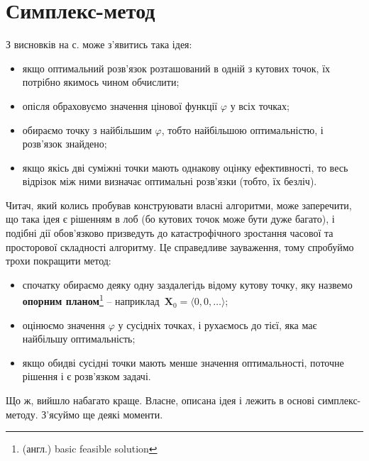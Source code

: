 \documentclass[\main/book.tex]{subfiles}
\begin{document}
\section{Симплекс-метод}
\label{section:linear:simplex}

З висновків на с. \pageref{conclusion:linear:optimal_solution} може з'явитись така ідея:

\begin{itemize}
 \item якщо оптимальний розв'язок розташований в одній з кутових точок, їх потрібно якимось чином обчислити;
 \item опісля обраховуємо значення цінової функції $\varphi$ у всіх точках;
 \item обираємо точку з найбільшим $\varphi$, тобто найбільшою оптимальністю, і розв'язок знайдено;
 \item якщо якісь дві суміжні точки мають однакову оцінку ефективності, то весь відрізок між ними визначає оптимальні розв'язки (тобто, їх безліч).
\end{itemize}

Читач, який колись пробував конструювати власні алгоритми, може заперечити, що така ідея є рішенням \flqq{}в лоб\frqq{} (бо кутових точок може бути дуже багато), і подібні дії обов'язково призведуть до катастрофічного зростання часової та просторової складності алгоритму. Це справедливе зауваження, тому спробуймо трохи покращити метод:

\begin{itemize}
 \item спочатку обираємо деяку одну заздалегідь відому кутову точку, яку назвемо \textbf{опорним планом}\footnote{(англ.) basic feasible solution} -- наприклад~$\mathbf{X}_0 = {\langle 0, 0, \ldots \rangle}$;
 \item оцінюємо значення $\varphi$ у сусідніх точках, і рухаємось до тієї, яка має найбільшу оптимальність;
 \item якщо обидві сусідні точки мають менше значення оптимальності, поточне рішення і є розв'язком задачі.
\end{itemize}

Що ж, вийшло набагато краще. Власне, описана ідея і лежить в основі симплекс-методу. З'ясуймо ще деякі моменти.
\end{document}
